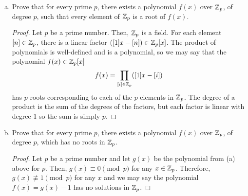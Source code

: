 \question \begin{enumerate}[(a)]
  \item Prove that for every prime $p$, there exists a polynomial $f(x)$ over $\mathbb{Z}_p$,
        of degree $p$, such that every element of $\mathbb{Z}_p$ is a root of $f(x)$.
        \begin{proof}
          Let $p$ be a prime number.
          Then, $\mathbb{Z}_p$ is a field.
          For each element $[n] \in \mathbb{Z}_p$, there is a linear factor $([1]x - [n]) \in \mathbb{Z}_p[x]$.
          The product of polynomials is well-defined and is a polynomial, so we may say that
          the polynomial $f(x) \in \mathbb{Z}_p[x]$ \[ f(x) = \prod_{[i] \in \mathbb{Z}_p}([1]x - [i]) \]
          has $p$ roots corresponding to each of the $p$ elements in $\mathbb{Z}_p$.
          The degree of a product is the sum of the degrees of the factors,
          but each factor is linear with degree 1 so the sum is simply $p$.
        \end{proof}
  \item Prove that for every prime $p$, there exists a polynomial $f(x)$ over $\mathbb{Z}_p$,
        of degree $p$, which has no roots in $\mathbb{Z}_p$.
        \begin{proof}
          Let $p$ be a prime number and let $g(x)$ be the polynomial from (a) above for $p$.
          Then, $g(x) \equiv 0 \pmod p$ for any $x \in \mathbb{Z}_p$.
          Therefore, $g(x) \not\equiv 1 \pmod p$ for any $x$ and we may say the polynomial
          $f(x) = g(x) - 1$ has no solutions in $\mathbb{Z}_p$.
        \end{proof}
\end{enumerate}


